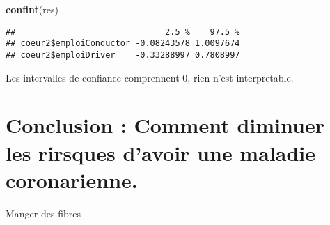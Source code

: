 \documentclass[
]{article}
\newenvironment{Shaded}{\begin{snugshade}}{\end{snugshade}}
\newcommand{\KeywordTok}[1]{\textcolor[rgb]{0.13,0.29,0.53}{\textbf{#1}}}
\newcommand{\NormalTok}[1]{#1}
\begin{document}
\begin{Shaded}
\begin{Highlighting}[]
\KeywordTok{confint}\NormalTok{(res)}
\end{Highlighting}
\end{Shaded}

\begin{verbatim}
##                              2.5 %    97.5 %
## coeur2$emploiConductor -0.08243578 1.0097674
## coeur2$emploiDriver    -0.33288997 0.7808997
\end{verbatim}

Les intervalles de confiance comprennent 0, rien n'est interpretable.

\hypertarget{conclusion-comment-diminuer-les-rirsques-davoir-une-maladie-coronarienne.}{%
\section{Conclusion : Comment diminuer les rirsques d'avoir une maladie
coronarienne.}\label{conclusion-comment-diminuer-les-rirsques-davoir-une-maladie-coronarienne.}}

Manger des fibres
\end{document}
